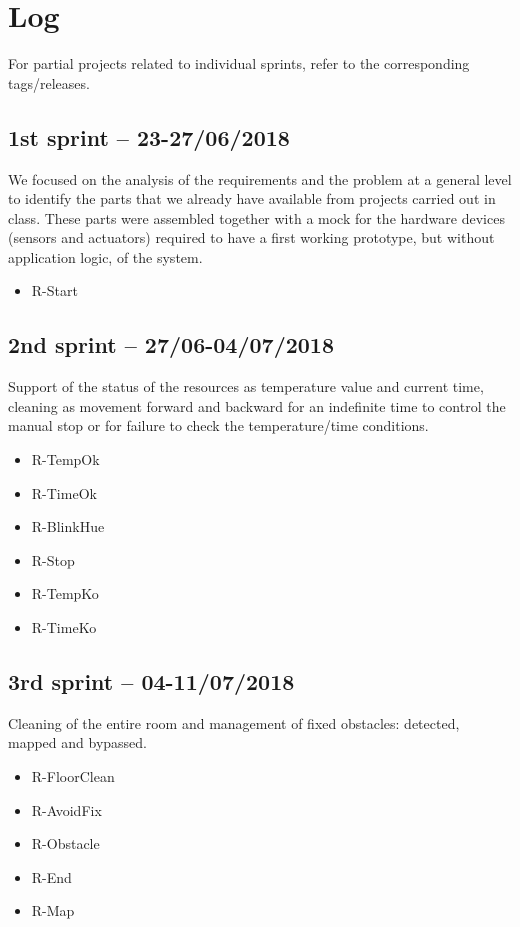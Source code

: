 \section{Log}

For partial projects related to individual sprints, refer to the corresponding tags/releases.

\subsection{1st sprint -- 23-27/06/2018}
We focused on the analysis of the requirements and the problem at a general level to identify the parts that we already have available from projects carried out in class. These parts were assembled together with a mock for the hardware devices (sensors and actuators) required to have a first working prototype, but without application logic, of the system.

\begin{itemize}
	\ttfamily
	\item R-Start
\end{itemize}

\subsection{2nd sprint -- 27/06-04/07/2018}
Support of the status of the resources as temperature value and current time, cleaning as movement forward and backward for an indefinite time to control the manual stop or for failure to check the temperature/time conditions.

\begin{itemize}
	\ttfamily
	\item R-TempOk
	\item R-TimeOk
	\item R-BlinkHue
	\item R-Stop
	\item R-TempKo
	\item R-TimeKo
\end{itemize}

\subsection{3rd sprint -- 04-11/07/2018}
Cleaning of the entire room and management of fixed obstacles: detected, mapped and bypassed.

\begin{itemize}
	\ttfamily
	\item R-FloorClean
	\item R-AvoidFix
	\item R-Obstacle
	\item R-End
	\item R-Map
\end{itemize}

